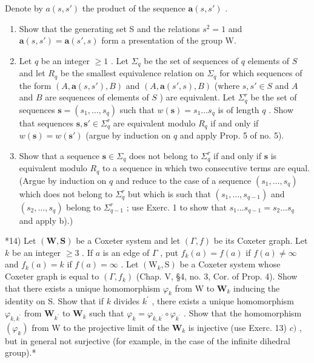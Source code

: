 Denote by \(a(s, s')\) the product of the sequence \(\mathbf{a}(s, s')\) .

\begin{enumerate}
\def\labelenumi{\alph{enumi})}
\item
  Show that the generating set S and the relations \(s^{2}=1\) and \(\mathbf{a}(s,s')=\mathbf{a}(s',s)\) form a presentation of the group W.
\item
  Let \(q\) be an integer \(\geqslant 1\) . Let \(\Sigma_q\) be the set of sequences of \(q\) elements of \(S\) and let \(R_q\) be the smallest equivalence relation on \(\Sigma_q\) for which sequences of the form \((A, \mathbf{a}(s, s'), B)\) and \((A, \mathbf{a}(s', s), B)\) (where \(s, s' \in S\) and \(A\) and \(B\) are sequences of elements of \(S\) ) are equivalent. Let \(\Sigma_q^r\) be the set of sequences \(\mathbf{s} = (s_1, \ldots, s_q)\) such that \(w(\mathbf{s}) = s_1 \ldots s_q\) is of length \(q\) . Show that sequences \(\mathbf{s}, \mathbf{s}' \in \Sigma_q^r\) are equivalent modulo \(R_q\) if and only if \(w(\mathbf{s}) = w(\mathbf{s}')\) (argue by induction on \(q\) and apply Prop. 5 of no. 5).
\item
  Show that a sequence \(\mathbf{s} \in \Sigma_q\) does not belong to \(\Sigma_q^r\) if and only if \(\mathbf{s}\) is equivalent modulo \(R_q\) to a sequence in which two consecutive terms are equal. (Argue by induction on \(q\) and reduce to the case of a sequence \((s_1, \ldots, s_q)\) which does not belong to \(\Sigma_q^r\) but which is such that \((s_1, \ldots, s_{q-1})\) and \((s_2, \ldots, s_q)\) belong to \(\Sigma_{q-1}^r\) ; use Exerc. 1 to show that \(s_1 \ldots s_{q-1} = s_2 \ldots s_q\) and apply b).)
\end{enumerate}

*14) Let \((\mathbf{W},\mathbf{S})\) be a Coxeter system and let \((\Gamma ,f)\) be its Coxeter graph. Let \(k\) be an integer \(\geqslant 3\) . If \(a\) is an edge of \(\Gamma\) , put \(f_{k}(a) = f(a)\) if \(f(a)\neq \infty\) and \(f_{k}(a) = k\) if \(f(a) = \infty\) . Let \((\mathrm{W}_k,\mathrm{S})\) be a Coxeter system whose Coxeter graph is equal to \((\Gamma ,f_k)\) (Chap. V, §4, no. 3, Cor. of Prop. 4). Show that there exists a unique homomorphism \(\varphi_{k}\) from W to \(\mathbf{W}_k\) inducing the identity on S. Show that if \(k\) divides \(k^{\prime}\) , there exists a unique homomorphism \(\varphi_{k,k^{\prime}}\) from \(\mathbf{W}_{k^{\prime}}\) to \(\mathbf{W}_k\) such that \(\varphi_{k} = \varphi_{k,k^{\prime}}\circ \varphi_{k^{\prime}}\) . Show that the homomorphism \((\varphi_{k})\) from W to the projective limit of the \(\mathbf{W}_k\) is injective (use Exerc. 13) \(c)\) , but in general not surjective (for example, in the case of the infinite dihedral group).*

